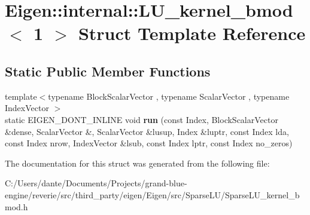\hypertarget{struct_eigen_1_1internal_1_1_l_u__kernel__bmod_3_011_01_4}{}\section{Eigen\+::internal\+::L\+U\+\_\+kernel\+\_\+bmod$<$ 1 $>$ Struct Template Reference}
\label{struct_eigen_1_1internal_1_1_l_u__kernel__bmod_3_011_01_4}
\subsection*{Static Public Member Functions}
\begin{DoxyCompactItemize}
\item 
\mbox{\label{struct_eigen_1_1internal_1_1_l_u__kernel__bmod_3_011_01_4_a92357890c666e71a99e9324b1465ca3c}} 
{\footnotesize template$<$typename Block\+Scalar\+Vector , typename Scalar\+Vector , typename Index\+Vector $>$ }\\static E\+I\+G\+E\+N\+\_\+\+D\+O\+N\+T\+\_\+\+I\+N\+L\+I\+NE void {\bfseries run} (const Index, Block\+Scalar\+Vector \&dense, Scalar\+Vector \&, Scalar\+Vector \&lusup, Index \&luptr, const Index lda, const Index nrow, Index\+Vector \&lsub, const Index lptr, const Index no\+\_\+zeros)
\end{DoxyCompactItemize}


The documentation for this struct was generated from the following file\+:\begin{DoxyCompactItemize}
\item 
C\+:/\+Users/dante/\+Documents/\+Projects/grand-\/blue-\/engine/reverie/src/third\+\_\+party/eigen/\+Eigen/src/\+Sparse\+L\+U/Sparse\+L\+U\+\_\+kernel\+\_\+bmod.\+h\end{DoxyCompactItemize}
